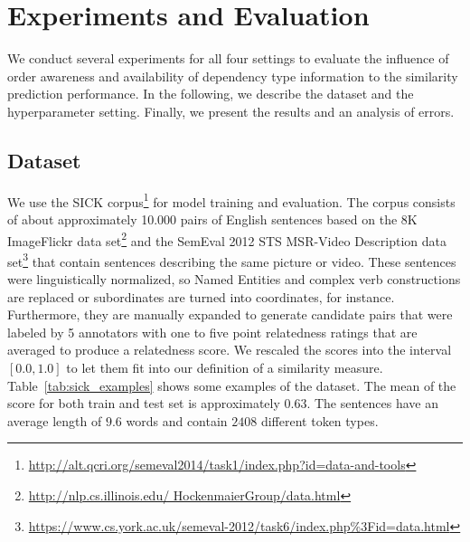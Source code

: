 \section{Experiments and Evaluation}
We conduct several experiments for all four settings to evaluate the influence of order awareness and availability of dependency type information to the similarity prediction performance. In the following, we describe the dataset and the hyperparameter setting. Finally, we present the results and an analysis of errors.

\subsection{Dataset}
We use the SICK corpus\footnote{\url{http://alt.qcri.org/semeval2014/task1/index.php?id=data-and-tools}} \autocite{marelli_sick_2014} for model training and evaluation. The corpus consists of about approximately 10.000 pairs of English sentences based on the 8K ImageFlickr data set\footnote{\url{http://nlp.cs.illinois.edu/
HockenmaierGroup/data.html}} \autocite{hodosh_framing_2013} and the SemEval 2012 STS MSR-Video Description data set\footnote{\url{https://www.cs.york.ac.uk/semeval-2012/task6/index.php\%3Fid=data.html}} \autocite{agirre_semeval-2012_2012} that contain sentences describing the same picture or video. These sentences were linguistically normalized, so Named Entities and complex verb constructions are replaced or subordinates are turned into coordinates, for instance. Furthermore, they are manually expanded to generate candidate pairs that were labeled by 5 annotators with one to five point relatedness ratings that are averaged to produce a relatedness score. We rescaled the scores into the interval $[0.0, 1.0]$ to let them fit into our definition of a similarity measure. Table~\ref{tab:sick_examples} shows some examples of the dataset. The mean of the score for both train and test set is approximately $0.63$. The sentences have an average length of $9.6$ words and contain $2408$ different token types.  

